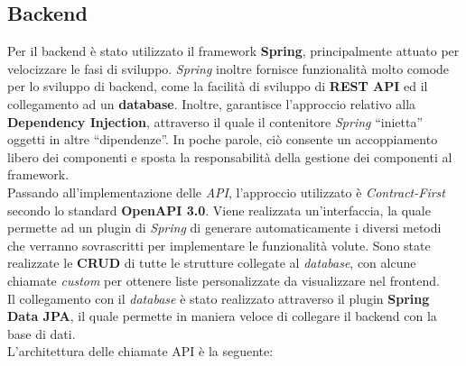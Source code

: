 \documentclass{article}
\begin{document}
\subsection{Backend}
Per il backend è stato utilizzato il framework \textbf{Spring}, principalmente attuato per velocizzare le fasi di sviluppo. \textit{Spring} inoltre fornisce funzionalità molto comode per lo sviluppo di backend, come la facilità di sviluppo di \textbf{REST API} ed il collegamento ad un \textbf{database}. Inoltre, garantisce l'approccio relativo alla \textbf{Dependency Injection}, attraverso il quale il contenitore \textit{Spring} “inietta” oggetti in altre “dipendenze”. In poche parole, ciò consente un accoppiamento libero dei componenti e sposta la responsabilità della gestione dei componenti al framework.\vspace*{7pt}\\
Passando all'implementazione delle \textit{API}, l'approccio utilizzato è \textit{Contract-First} secondo lo standard \textbf{OpenAPI 3.0}. Viene realizzata un'interfaccia, la quale permette ad un plugin di \textit{Spring} di generare automaticamente i diversi metodi che verranno sovrascritti per implementare le funzionalità volute. Sono state realizzate le \textbf{CRUD} di tutte le strutture collegate al \textit{database}, con alcune chiamate \textit{custom} per ottenere liste personalizzate da visualizzare nel frontend.\vspace*{7pt}\\
Il collegamento con il \textit{database} è stato realizzato attraverso il plugin \textbf{Spring Data JPA}, il quale permette in maniera veloce di collegare il backend con la base di dati.\vspace*{7pt}\\
L'architettura delle chiamate API è la seguente:
\end{document}
